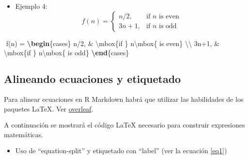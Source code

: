 \documentclass[12pt,a4paper,oneside,]{book}
\newenvironment{Shaded}{\begin{snugshade}}{\end{snugshade}}
\newcommand{\ExtensionTok}[1]{#1}
\newcommand{\KeywordTok}[1]{\textcolor[rgb]{0.13,0.29,0.53}{\textbf{#1}}}
\newcommand{\NormalTok}[1]{#1}
\newcommand{\SpecialCharTok}[1]{\textcolor[rgb]{0.00,0.00,0.00}{#1}}
\newcommand{\SpecialStringTok}[1]{\textcolor[rgb]{0.31,0.60,0.02}{#1}}
\providecommand{\tightlist}{%
  \setlength{\itemsep}{0pt}\setlength{\parskip}{0pt}}
\numberwithin{dummy}{section}
\theoremstyle{ocrenumbox}
\theoremstyle{blacknumex}
\theoremstyle{blacknumbox}
\theoremstyle{ocrenum}
\theoremstyle{ocrenum}
\begin{document}
\begin{itemize}
\tightlist
\item
  Ejemplo 4: \[
  f(n) = 
  \begin{cases} 
  n/2,  & \mbox{if } n\mbox{ is even} \\ 
  3n+1, & \mbox{if } n\mbox{ is odd} 
  \end{cases}
  \]
\end{itemize}

\begin{Shaded}
\begin{Highlighting}[]
\SpecialStringTok{$$}
\SpecialStringTok{f(n) = }
\KeywordTok{\textbackslash{}begin}\NormalTok{\{}\ExtensionTok{cases}\NormalTok{\}}\SpecialStringTok{ }
\SpecialStringTok{  n/2,  \& }\SpecialCharTok{\textbackslash{}mbox}\NormalTok{\{if \}}\SpecialStringTok{ n}\SpecialCharTok{\textbackslash{}mbox}\SpecialStringTok{\{ is even\} }\SpecialCharTok{\textbackslash{}\textbackslash{}}\SpecialStringTok{ }
\SpecialStringTok{  3n+1, \& }\SpecialCharTok{\textbackslash{}mbox}\NormalTok{\{if \}}\SpecialStringTok{ n}\SpecialCharTok{\textbackslash{}mbox}\SpecialStringTok{\{ is odd\} }
\KeywordTok{\textbackslash{}end}\NormalTok{\{}\ExtensionTok{cases}\NormalTok{\}}
\SpecialStringTok{$$}
\end{Highlighting}
\end{Shaded}

\hypertarget{etiquetadomatematico}{%
\subsection{Alineando ecuaciones y
etiquetado}\label{etiquetadomatematico}}

Para alinear ecuaciones en R Markdown habrá que utilizar las habilidades
de los paquetes LaTeX. Ver
\href{https://www.overleaf.com/learn/latex/Aligning_equations_with_amsmath}{overleaf}.

A continuación se mostrará el código LaTeX necesario para construir
expresiones matemáticas.

\begin{itemize}
\tightlist
\item
  Uso de ``equation-split'' y etiquetado con ``label'' (ver la ecuación
  \ref{eq1})
\end{itemize}
\end{document}

